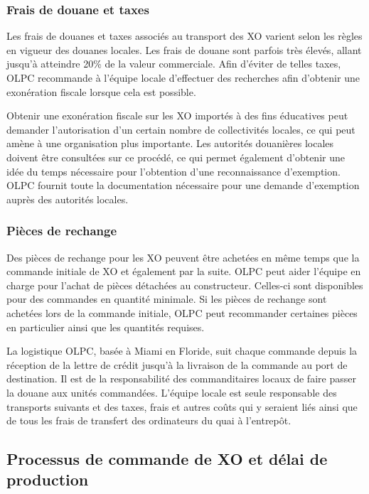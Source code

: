 \documentclass[12pt]{article}
\begin{document}
\subsubsection{Frais de douane et taxes}
\label{sec-8-2-3}



Les frais de douanes et taxes associés au transport des XO varient selon
les règles en vigueur des douanes locales. Les frais de douane sont parfois
très élevés, allant jusqu'à atteindre 20\% de la valeur commerciale. Afin
d'éviter de telles taxes, OLPC recommande à l'équipe locale d'effectuer des
recherches afin d'obtenir une exonération fiscale lorsque cela est
possible.


Obtenir une exonération fiscale sur les XO importés à des fins éducatives
peut demander l'autorisation d'un certain nombre de collectivités locales,
ce qui peut amène à une organisation plus importante. Les autorités
douanières locales doivent être consultées sur ce procédé, ce qui permet
également d'obtenir une idée du temps nécessaire pour l'obtention d'une
reconnaissance d'exemption. OLPC fournit toute la documentation nécessaire
pour une demande d'exemption auprès des autorités locales.
\subsubsection{Pièces de rechange}
\label{sec-8-2-4}




Des pièces de rechange pour les XO peuvent être achetées en même temps que
la commande initiale de XO et également par la suite. OLPC peut aider
l'équipe en charge pour l'achat de pièces détachées au
constructeur. Celles-ci sont disponibles pour des commandes en quantité
minimale. Si les pièces de rechange sont achetées lors de la commande
initiale, OLPC peut recommander certaines pièces en particulier ainsi que
les quantités requises.

La logistique OLPC, basée à Miami en Floride, suit chaque commande depuis
la réception de la lettre de crédit jusqu'à la livraison de la commande au
port de destination. Il est de la responsabilité des commanditaires locaux
de faire passer la douane aux unités commandées. L'équipe locale est seule
responsable des transports suivants et des taxes, frais et autres coûts qui
y seraient liés ainsi que de tous les frais de transfert des ordinateurs du
quai à l'entrepôt.
\subsection{Processus de commande de XO et délai de production}
\label{sec-8-3}
\end{document}
